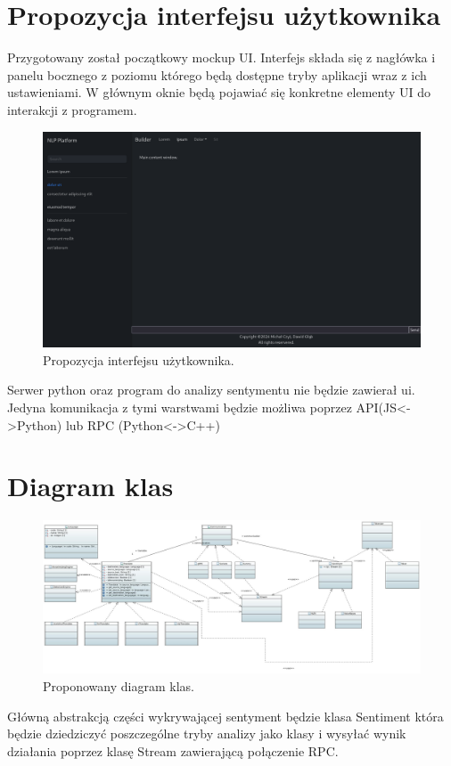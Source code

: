 \documentclass{article}
\begin{document}
\section{Propozycja interfejsu użytkownika}

Przygotowany został początkowy mockup UI. 
Interfejs składa się z nagłówka i panelu bocznego z poziomu którego będą dostępne tryby aplikacji wraz z ich ustawieniami. W głównym oknie będą pojawiać się konkretne elementy UI do interakcji z programem.

\begin{figure}
\centering
  \includegraphics[width=1\linewidth]{ui_mockup.png}
  \caption{\label{fig:ui mockup}Propozycja interfejsu użytkownika.}
\end{figure}

Serwer python oraz program do analizy sentymentu nie będzie zawierał ui. Jedyna komunikacja z tymi warstwami będzie możliwa poprzez API(JS<->Python) lub RPC (Python<->C++)

\section{Diagram klas}

\begin{figure}
\centering
    \includegraphics[width=1\linewidth]{Class_Diagram.JPG}
    \caption{\label{fig:Class Diagram}Proponowany diagram klas.}
\end{figure}

Główną abstrakcją części wykrywającej sentyment będzie klasa Sentiment która będzie dziedziczyć poszczególne tryby analizy jako klasy i wysyłać wynik działania poprzez klasę Stream zawierającą połączenie RPC.
\end{document}

